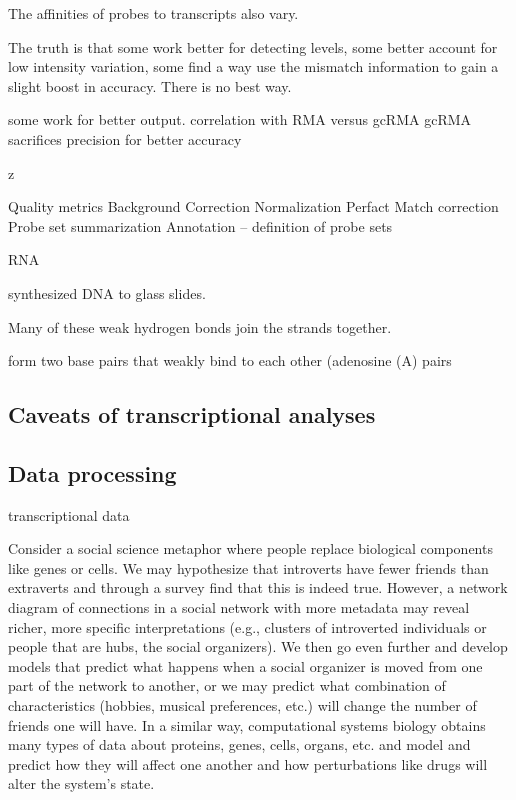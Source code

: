 The affinities of probes to transcripts also vary.


The truth is that some work better for detecting levels, some
better account for low intensity variation, some find a way use the mismatch
information to gain a slight boost in accuracy. There is no best way.

some work for better output. correlation with RMA versus gcRMA
gcRMA sacrifices precision for better accuracy





z


Quality metrics
Background Correction
Normalization
Perfact Match correction
Probe set summarization
  Annotation -- definition of probe sets
  
  


RNA


synthesized DNA to glass slides.


Many of these weak hydrogen bonds join the strands together. 
 



form two base pairs that weakly bind to each other 
(adenosine (A) pairs 


\subsection{Caveats of transcriptional analyses}




\subsection{Data processing}


 transcriptional data




Consider a social science metaphor where people replace biological 
components like genes or cells. We may hypothesize that 
introverts have fewer friends than extraverts and through 
a survey find that this is indeed true. However, a network 
diagram of connections in a social network with more metadata 
may reveal richer, more specific interpretations (e.g., 
clusters of introverted individuals or people that are 
hubs, the social organizers). We then go even further 
and develop models that predict what happens when a 
social organizer is moved from one part of the network to 
another, or we may predict what combination of characteristics 
(hobbies, musical preferences, etc.) will change the number 
of friends one will have. In a similar way, computational 
systems biology obtains many types of data about proteins, 
genes, cells, organs, etc. and model and predict how they 
will affect one another and how perturbations like drugs 
will alter the system’s state.




